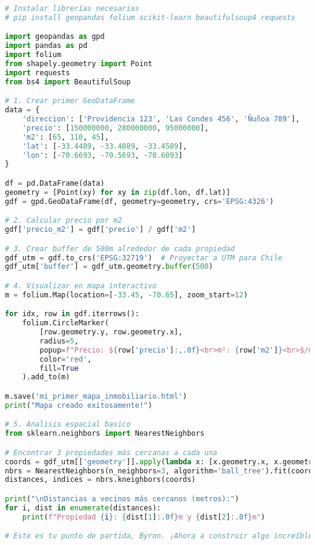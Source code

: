 \documentclass[12pt,a4paper]{article}
\begin{document}
\begin{lstlisting}[language=Python, caption=Script inicial para Byron]
# Instalar librerías necesarias
# pip install geopandas folium scikit-learn beautifulsoup4 requests

import geopandas as gpd
import pandas as pd
import folium
from shapely.geometry import Point
import requests
from bs4 import BeautifulSoup

# 1. Crear primer GeoDataFrame
data = {
    'direccion': ['Providencia 123', 'Las Condes 456', 'Ñuñoa 789'],
    'precio': [150000000, 280000000, 95000000],
    'm2': [65, 110, 45],
    'lat': [-33.4489, -33.4089, -33.4589],
    'lon': [-70.6693, -70.5693, -70.6093]
}

df = pd.DataFrame(data)
geometry = [Point(xy) for xy in zip(df.lon, df.lat)]
gdf = gpd.GeoDataFrame(df, geometry=geometry, crs='EPSG:4326')

# 2. Calcular precio por m2
gdf['precio_m2'] = gdf['precio'] / gdf['m2']

# 3. Crear buffer de 500m alrededor de cada propiedad
gdf_utm = gdf.to_crs('EPSG:32719')  # Proyectar a UTM para Chile
gdf_utm['buffer'] = gdf_utm.geometry.buffer(500)

# 4. Visualizar en mapa interactivo
m = folium.Map(location=[-33.45, -70.65], zoom_start=12)

for idx, row in gdf.iterrows():
    folium.CircleMarker(
        [row.geometry.y, row.geometry.x],
        radius=5,
        popup=f"Precio: ${row['precio']:,.0f}<br>m²: {row['m2']}<br>$/m²: ${row['precio_m2']:,.0f}",
        color='red',
        fill=True
    ).add_to(m)

m.save('mi_primer_mapa_inmobiliario.html')
print("Mapa creado exitosamente!")

# 5. Analisis espacial basico
from sklearn.neighbors import NearestNeighbors

# Encontrar 3 propiedades más cercanas a cada una
coords = gdf_utm[['geometry']].apply(lambda x: [x.geometry.x, x.geometry.y], axis=1).tolist()
nbrs = NearestNeighbors(n_neighbors=3, algorithm='ball_tree').fit(coords)
distances, indices = nbrs.kneighbors(coords)

print("\nDistancias a vecinos más cercanos (metros):")
for i, dist in enumerate(distances):
    print(f"Propiedad {i}: {dist[1]:.0f}m y {dist[2]:.0f}m")

# Este es tu punto de partida, Byron. ¡Ahora a construir algo increíble!
\end{lstlisting}
\end{document}
